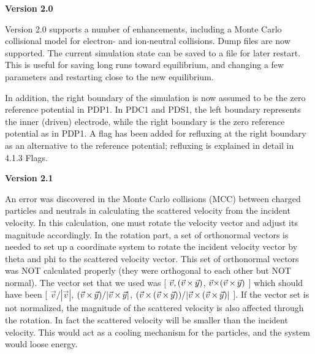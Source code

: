 \begin{section}
\begin{subsection}
\begin{subsubsection}
{\bf Version 2.0}

      Version 2.0 supports a number of enhancements, including a Monte Carlo
      collisional model for electron- and ion-neutral collisions.  Dump files
      are now supported.   The current simulation state can be saved to a file
      for later restart.  This is useful for saving long runs toward
      equilibrium, and changing a few parameters and restarting close to the
      new equilibrium.

\vspace{.2in}

\noindent
      In addition, the right boundary of the simulation is now assumed to be
      the zero reference potential in PDP1.  In PDC1 and PDS1, the left
      boundary represents the inner (driven) electrode, while the right
      boundary is the zero reference potential as in PDP1.  A flag has been
      added for refluxing at the right boundary as an alternative to the
      reference potential; refluxing is explained in detail in 4.1.3 Flags.
\end{subsubsection}

\begin{subsubsection}
{\bf Version 2.1}

      An error was discovered in the Monte Carlo collisions (MCC) between
      charged particles and neutrals in calculating the scattered velocity from
      the incident velocity.  In this calculation, one must rotate the velocity
      vector and adjust its magnitude accordingly.  In the rotation part, a set
      of orthonormal vectors is needed to set up a coordinate system to rotate
      the incident velocity vector by theta and phi to the scattered velocity
      vector.  This set of orthonormal vectors was NOT calculated properly
      (they were orthogonal to each other but NOT normal). The vector set that
      we used was 
[
$\vec{v}, (\vec{v} \, {\bf \times} \, \vec{y})$, 
$\vec{v} {\bf \times} (\vec{v} \, {\bf \times} \, \vec{y})$
]  
which should have been 
[
$\vec{v} / |\vec {v}|$, 
$(\vec{v} \, {\bf \times} \, \vec{y}) / |\vec{v} \, {\bf \times} \, \vec{y}|$,
$(\vec{v} \, {\bf \times} \, (\vec{v} \, {\bf \times} \, \vec{y})) / 
|\vec{v} \, {\bf \times} \, (\vec{v} \, {\bf \times} \, \vec{y})|$  
].
	If the vector set is not normalized, the magnitude of the
	scattered velocity
      is also affected through the rotation.  In fact the scattered velocity
      will be smaller than the incident velocity.  This would act as a cooling
      mechanism for the particles, and the system would loose energy.
\vspace{.2in}


\end{subsubsection}
\end{subsection}
\end{section}
